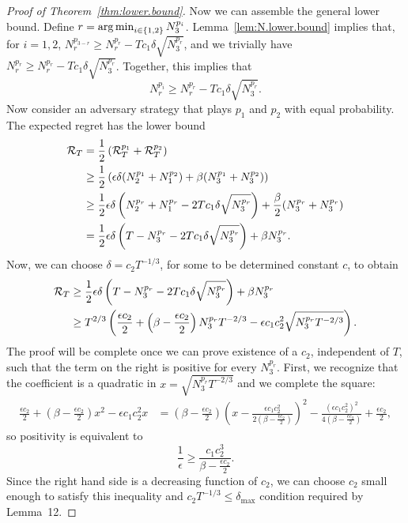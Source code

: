 \documentclass[11pt]{article}
\begin{document}
\begin{proof}[Proof of Theorem~\ref{thm:lower.bound}]
Now we can assemble the general lower bound. Define $r = \operatorname*{arg\,min}_{i\in\{1,2\}} N^{p_i}_3$.  Lemma~\ref{lem:N.lower.bound} implies that, for $i=1,2$,
$N^{p_{3-r}}_{r} \geq N^{p_{r}}_{r}  - Tc_1\delta\sqrt{ N^{p_{r}}_{3}}$, and we trivially have $N^{p_{r}}_{r} \geq N^{p_{r}}_{r}  - Tc_1\delta\sqrt{ N^{p_{r}}_{3}}$. Together, this implies that
\[
  N^{p_{i}}_{r} \geq N^{p_{r}}_{r}  - Tc_1\delta \sqrt{ N^{p_{r}}_{3}}.
\]
Now consider an adversary strategy that plays $p_1$ and $p_2$ with equal probability. The expected regret has the lower bound
\begin{align*}
    \mathcal R_T
  &=
    \frac{1}{2}\left(\mathcal R_T^{p_1} + \mathcal R_T^{p_2}\right)\\
  &\geq
    \frac{1}{2}\left(
    \epsilon\delta (N^{p_1}_2 + N^{p_2}_1) + \beta (N_3^{p_1} + N_3^{p_2})
    \right)\\
  &\geq
    \frac{1}{2}\epsilon\delta\left(    
    N^{p_r}_2 + N^{p_r}_1 - 2Tc_1\delta\sqrt{N^{p_r}_3}
    \right)
    +
    \frac{\beta}{2}(N_3^{p_r} + N_3^{p_r})\\
  &=
    \frac{1}{2}\epsilon\delta\left(    
    T-N^{p_r}_3 - 2Tc_1\delta\sqrt{N^{p_r}_3}
    \right)
    +
    \beta N_3^{p_r}.
\end{align*}
Now, we can choose $\delta = c_2 T^{-1/3}$, for some to be determined constant $c$,  to obtain
\begin{align*}
  \mathcal R_T
  &\geq
    \frac{1}{2}\epsilon\delta\left(    
    T-N^{p_r}_3 - 2Tc_1\delta\sqrt{N^{p_r}_3}
    \right)
    +
    \beta N_3^{p_r}\\
  &\geq
    T^{2/3}\left(    
    \frac{\epsilon c_2}{2}
    +
    \left(\beta -  \frac{\epsilon c_2}{2}\right)N^{p_r}_3T^{-2/3}
    - \epsilon c_1c_2^2\sqrt{N^{p_r}_3T^{-2/3}}
    \right).
\end{align*}
The proof will be complete once we can prove existence of a $c_2$, independent of $T$, such that the term on the right is positive for every $N^{p_r}_3$. First, we recognize that the coefficient is a quadratic in $x = \sqrt{N^{p_r}_3T^{-2/3}}$ and we complete the square:
\begin{align*}
    \frac{\epsilon c_2}{2}
    +
    \left(\beta -  \frac{\epsilon c_2}{2}\right)x^2
  - \epsilon c_1c_2^2 x
  &=
    \left(\beta -  \frac{\epsilon c_2}{2}\right)
    \left(x - \frac{\epsilon c_1 c_2^2}{2\left(\beta -  \frac{\epsilon c_2}{2}\right)}\right)^2
    -
   \frac{(\epsilon c_1 c_2^2)^2}{4\left(\beta -  \frac{\epsilon c_2}{2}\right)}
    + \frac{\epsilon c_2}{2},
\end{align*}
so positivity is equivalent to
\[
  \frac{1}{\epsilon}
  \geq
  \frac{c_1 c_2^3}{\beta -  \frac{\epsilon c_2}{2}}.
\]
Since the right hand side is a decreasing function of $c_2$, we can choose $c_2$ small enough to satisfy this inequality and $c_2 T^{-1/3}\leq\delta_{\max}$ condition required by Lemma~12.


\end{proof}
\end{document}
